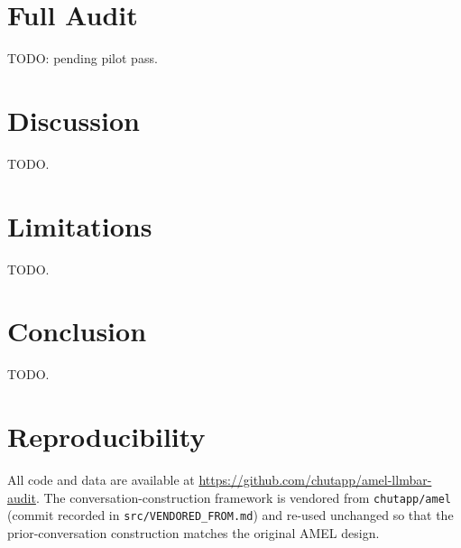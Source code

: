 \documentclass[10pt,twocolumn]{article}
\begin{document}
\section{Full Audit}
\label{sec:audit}

TODO: pending pilot pass.

\section{Discussion}

TODO.

\section{Limitations}

TODO.

\section{Conclusion}

TODO.

\section*{Reproducibility}
All code and data are available at
\url{https://github.com/chutapp/amel-llmbar-audit}. The
conversation-construction framework is vendored from
\texttt{chutapp/amel} (commit recorded in
\texttt{src/VENDORED\_FROM.md}) and re-used unchanged so that the
prior-conversation construction matches the original AMEL design.



\end{document}
